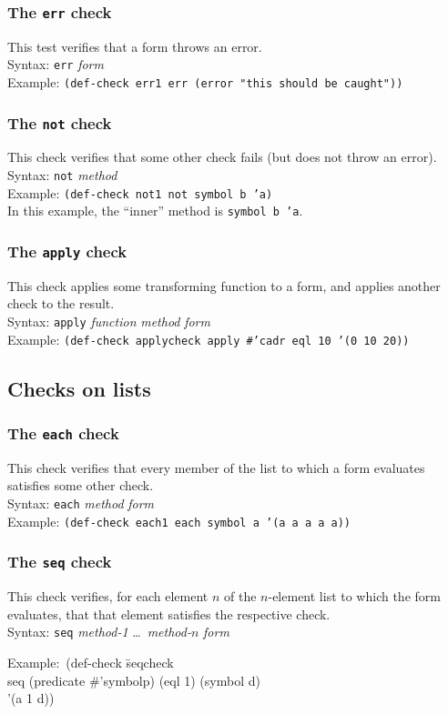 \documentclass{article}
\begin{document}
\subsubsection{The \texttt{err} check} 
This test verifies that a form throws an error.
\\ Syntax: \texttt{err} \textit{form}
\\ Example: \texttt{(def-check err1 err (error "this should be caught"))}

\subsubsection{The \texttt{not} check} 
This check verifies that some other check fails (but does not throw an
error).
\\ Syntax: \texttt{not} \textit{method}
\\ Example: \texttt{(def-check not1 not symbol b 'a)}
\\In this example, the ``inner'' method is \texttt{symbol b 'a}\enspace.

\subsubsection{The \texttt{apply} check} 
This check applies some transforming function to a form, and applies
another check to the result.
\\ Syntax: \texttt{apply} \textit{function} \textit{method} \textit{form}
\\ Example: \texttt{(def-check applycheck apply \#'cadr eql 10 '(0 10 20))}
\subsection{Checks on lists}

\subsubsection{The \texttt{each} check} 
This check verifies that every member of the list to which a form
evaluates satisfies some other check.
\\ Syntax: \texttt{each} \textit{method} \textit{form}
\\ Example: \texttt{(def-check each1 each symbol a '(a a a a a))}

\subsubsection{The \texttt{seq} check} 
This check verifies, for each element $n$ of the $n$-element list to
which the form evaluates, that that element satisfies the respective
check.
\\ Syntax: \texttt{seq} \textit{method-1} \ldots\ \textit{method-$n$} \textit{form}
{\ttfamily\begin{tabbing}
\textrm{Example:}\ (def-check \=seqcheck
\\ \>  seq (predicate \#'symbolp) (eql 1) (symbol d)
\\ \>  '(a 1 d))
\end{tabbing}}
\end{document}
